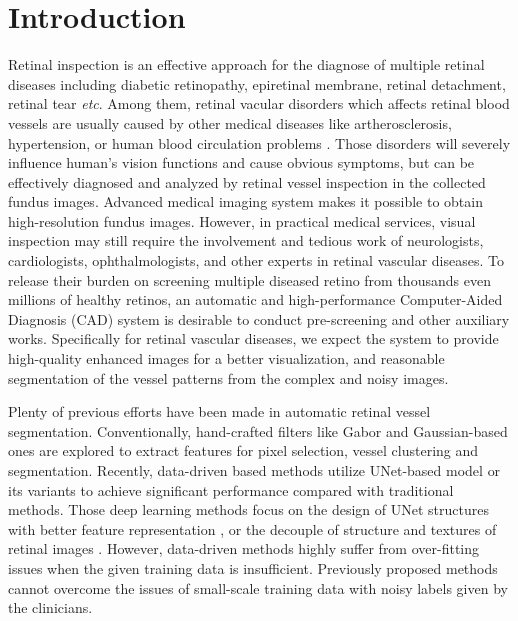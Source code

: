 \documentclass[runningheads]{llncs}
\begin{document}
\section{Introduction}
Retinal inspection is an effective approach for the diagnose of multiple retinal diseases including diabetic retinopathy, epiretinal membrane, retinal detachment, retinal tear \textit{etc}. Among them, retinal vacular disorders which affects retinal blood vessels are usually caused by other medical diseases like artherosclerosis, hypertension, or human blood circulation problems \cite{brand2012management}. Those disorders will severely influence human's vision functions and cause obvious symptoms, but can be effectively diagnosed and analyzed by retinal vessel inspection in the collected fundus images. Advanced medical imaging system makes it possible to obtain high-resolution fundus images. However, in practical medical services, visual inspection may still require the involvement and tedious work of neurologists, cardiologists, ophthalmologists, and other experts in retinal vascular diseases. To release their burden on screening multiple diseased retino from thousands even millions of healthy retinos, an automatic and high-performance Computer-Aided Diagnosis (CAD) system is desirable to conduct pre-screening and other auxiliary works. Specifically for retinal vascular diseases, we expect the system to provide high-quality enhanced images for a better visualization, and reasonable segmentation of the vessel patterns from the complex and noisy images.   

Plenty of previous efforts have been made in automatic retinal vessel segmentation. Conventionally, hand-crafted filters \cite{niemeijer2004comparative,oloumi2007detection,ricci2007retinal,you2011segmentation} like Gabor \cite{oloumi2007detection} and Gaussian-based ones \cite{niemeijer2004comparative} are explored to extract features for pixel selection, vessel clustering and segmentation. Recently, data-driven based methods utilize UNet-based model \cite{ronneberger2015u} or its variants \cite{wang2020rvseg,xu2020boosting,zhang2020befd,zhang2020retinal,lan2020elastic} to achieve significant performance compared with traditional methods. Those deep learning methods focus on the design of UNet structures with better feature representation \cite{zhang2020befd,wang2020rvseg}, or the decouple of structure and textures of retinal images \cite{zhang2020retinal}. However, data-driven methods highly suffer from over-fitting issues when the given training data is insufficient. Previously proposed methods cannot overcome the issues of small-scale training data with noisy labels given by the clinicians. 
\end{document}
